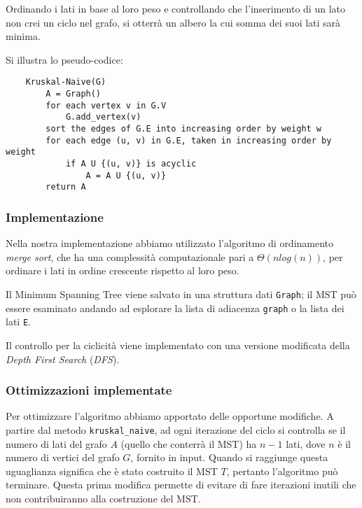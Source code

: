 Ordinando i lati in base al loro peso e controllando che l'inserimento
di un lato non crei un ciclo nel grafo, si otterrà un albero la cui
somma dei suoi lati sarà minima.

\noindent Si illustra lo pseudo-codice:
\begin{verbatim}
    Kruskal-Naive(G)
        A = Graph()
        for each vertex v in G.V
            G.add_vertex(v)
        sort the edges of G.E into increasing order by weight w
        for each edge (u, v) in G.E, taken in increasing order by weight
            if A U {(u, v)} is acyclic
                A = A U {(u, v)}
        return A
\end{verbatim}

\subsubsection{Implementazione}

Nella nostra implementazione abbiamo utilizzato l'algoritmo di
ordinamento \textit{merge sort}, che ha una complessità
computazionale pari a $\Theta(n log(n))$, per ordinare i lati
in ordine crescente rispetto al loro peso.

Il Minimum Spanning Tree viene salvato in una struttura dati
\verb|Graph|; il MST può essere esaminato andando ad
esplorare la lista di adiacenza \verb|graph| o la lista dei
lati \verb|E|.

Il controllo per la ciclicità viene implementato con una
versione modificata della \textit{Depth First Search}
(\textit{DFS}).

\subsubsection{Ottimizzazioni implementate}

Per ottimizzare l'algoritmo abbiamo apportato delle opportune
modifiche. A partire dal metodo \verb|kruskal_naive|, ad
ogni iterazione del ciclo si controlla se il numero di lati
del grafo $A$ (quello che conterrà il MST) ha $n - 1$ lati,
dove $n$ è il numero di vertici del grafo $G$, fornito in input.
Quando si raggiunge questa uguaglianza significa che è stato
costruito il MST $T$, pertanto l'algoritmo può terminare.
Questa prima modifica permette di evitare di fare iterazioni
inutili che non contribuiranno alla costruzione del MST.

